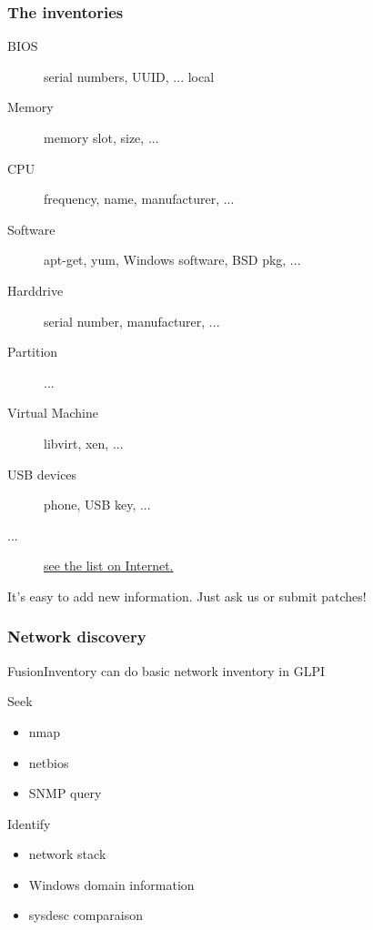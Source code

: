 \begin{frame}
    \frametitle{The inventories}

    \begin{description}
        \item[BIOS] serial numbers, UUID, ... local
        \item[Memory] memory slot, size, ...
        \item[CPU] frequency, name, manufacturer, ...
        \item[Software] apt-get, yum, Windows software, BSD pkg, ...
        \item[Harddrive] serial number, manufacturer, ...
        \item[Partition] ...
        \item[Virtual Machine] libvirt, xen, ...
        \item[USB devices] phone, USB key, ...
        \item[...] \href{http://search.cpan.org/dist/FusionInventory-Agent/lib/FusionInventory/Agent/XML/Query/Inventory.pm}{see the list on Internet.}
    \end{description}

    It's easy to add new information. Just ask us or submit patches!

\end{frame}

\begin{frame}
    \frametitle{Network discovery}

    FusionInventory can do basic network inventory in GLPI
    \begin{block}{Seek}
    \begin{itemize}
      \item nmap
      \item netbios
      \item SNMP query
    \end{itemize}
    \end{block}
    \begin{block}{Identify}
    \begin{itemize}
        \item network stack
        \item Windows domain information
        \item sysdesc comparaison
    \end{itemize}
    \end{block}
\end{frame}

